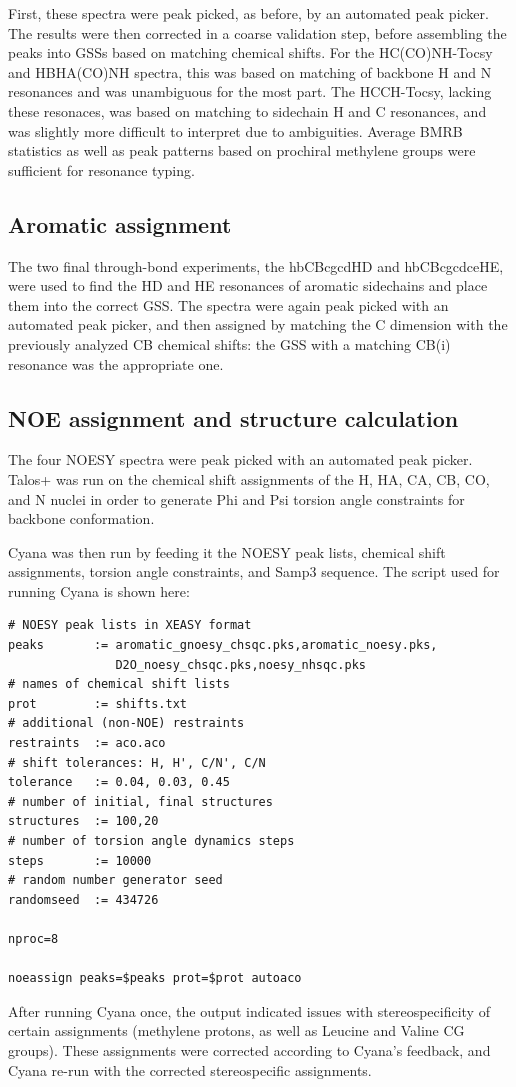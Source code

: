 First, these spectra were peak picked, as before, by an automated peak picker.
The results were then corrected in a coarse validation step, before assembling
the peaks into GSSs based on matching chemical shifts.  For the HC(CO)NH-Tocsy
and HBHA(CO)NH spectra, this was based on matching of backbone H and N
resonances and was unambiguous for the most part.  The HCCH-Tocsy, lacking these
resonaces, was based on matching to sidechain H and C resonances, and was
slightly more difficult to interpret due to ambiguities.  
Average BMRB statistics as well as peak patterns based on prochiral methylene
groups were sufficient for resonance typing.

\subsection{Aromatic assignment}
The two final through-bond experiments, the hbCBcgcdHD and hbCBcgcdceHE, were
used to find the HD and HE resonances of aromatic sidechains and place them
into the correct GSS.  The spectra were again peak picked with an automated
peak picker, and then assigned by matching the C dimension with the previously
analyzed CB chemical shifts: the GSS with a matching CB(i) resonance was the
appropriate one.

\subsection{NOE assignment and structure calculation}
The four NOESY spectra were peak picked with an automated peak picker.  
Talos+ \cite{talos+} was run on the chemical shift assignments of the H, HA,
CA, CB, CO, and N nuclei in order to generate Phi and Psi torsion angle 
constraints for backbone conformation.

Cyana was then run by feeding it the NOESY peak lists, chemical shift
assignments, torsion angle constraints, and Samp3 sequence.  The script
used for running Cyana is shown here:
\begin{verbatim}
# NOESY peak lists in XEASY format
peaks       := aromatic_gnoesy_chsqc.pks,aromatic_noesy.pks,
               D2O_noesy_chsqc.pks,noesy_nhsqc.pks
# names of chemical shift lists
prot        := shifts.txt                
# additional (non-NOE) restraints
restraints  := aco.aco                   
# shift tolerances: H, H', C/N', C/N
tolerance   := 0.04, 0.03, 0.45          
# number of initial, final structures
structures  := 100,20                    
# number of torsion angle dynamics steps
steps       := 10000                    
# random number generator seed
randomseed  := 434726                    

nproc=8

noeassign peaks=$peaks prot=$prot autoaco
\end{verbatim}
After running Cyana once, the output indicated issues with stereospecificity
of certain assignments (methylene protons, as well as Leucine and Valine
CG groups).  These assignments were corrected according to Cyana's feedback,
and Cyana re-run with the corrected stereospecific assignments.



